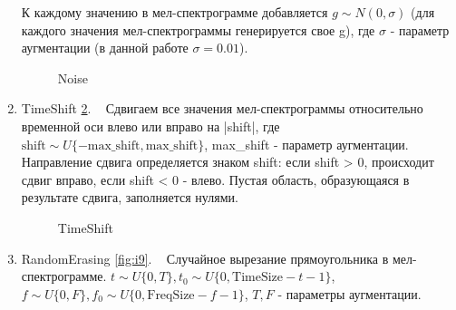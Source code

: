 \documentclass[12pt, fleqn]{article}
\begin{document}
\begin{enumerate}
		К каждому значению в мел-спектрограмме добавляется $g \sim N(0, \sigma)$ (для каждого значения мел-спектрограммы генерируется свое g), где $\sigma$ - параметр аугментации (в данной работе $\sigma = 0.01$). 
		\begin{figure}[h]
			\caption{Noise}
			\label{fig:i7}
		\end{figure}
		\item TimeShift \ref{fig:i8}. ~\cite{b2} \newline Сдвигаем все значения мел-спектрограммы относительно временной оси влево или вправо на |shift|, где $\text{shift} \sim U\{-\text{max\_shift}, \text{max\_shift}\}$, max\_shift - параметр аугментации. Направление сдвига определяется знаком shift: если \newline shift > 0, происходит сдвиг вправо, если shift < 0 - влево. Пустая область, образующаяся в результате сдвига, заполняется нулями.
		\begin{figure}[h]
			\caption{TimeShift}
			\label{fig:i8}
		\end{figure}
		\item RandomErasing \ref{fig:i9}. ~\cite{b3} Случайное вырезание прямоугольника в мел-спектрограмме. \newline
		$t \sim U\{0, T\}, t_0 \sim U\{0, \text{TimeSize} - t - 1\}$, \newline $f \sim U\{0, F\}, f_0 \sim U\{0, \text{FreqSize} - f - 1\}$, $T, F$ - параметры аугментации. \newline

\end{enumerate}
\end{document}

